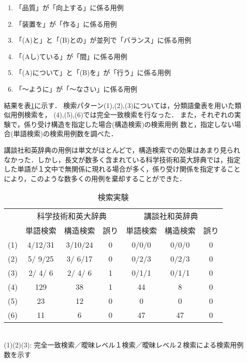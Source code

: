 \begin{enumerate}
\item 「品質」が「向上する」に係る用例
\item 「装置を」が「作る」に係る用例
\item 「(A)と」と「(B)との」が並列で「バランス」に係る用例
\item 「(Aし)ている」が「間」に係る用例
\item 「(A)について」と「(B)を」が「行う」に係る用例
\item 「〜ように」が「〜なさい」に係る用例
\end{enumerate}

結果を表\ref{answer}に示す．
検索パターン(1),(2),(3)については，分類語彙表を用いた類似用例検索を，
(4),(5),(6)では完全一致検索を行なった．
また，それぞれの実験で，係り受け構造を指定した場合(構造検索)の検索用例
数と，指定しない場合(単語検索)の検索用例数を調べた．

講談社和英辞典の用例は単文がほとんどで，構造検索での効果はあまり見られ
なかった．しかし，長文が数多く含まれている科学技術和英大辞典では，指定
した単語が１文中で無関係に現れる場合が多く，係り受け関係を指定すること
により，このような数多くの用例を棄却することができた．

\begin{table}[htb]
\begin{center}
\caption{検索実験}
\label{answer}
\begin{tabular}{|c||c|c|c|c|c|c|} \hline
\small
& \multicolumn{3}{c|}{科学技術和英大辞典} 
& \multicolumn{3}{c|}{\ \ \ 講談社和英辞典 \ \ \ } \\ \cline{2-7} 
& 単語検索  & 構造検索 & 誤り & 単語検索 & 構造検索  &  誤り \\ \hline \hline
(1) &  4/12/31 &  3/10/24 & 0 &  0/0/0 &  0/0/0 & 0     \\ \cline{1-7}
(2) &  5/ 9/25 &  3/ 6/17 & 0 &  0/2/3 &  0/2/3 & 0     \\ \cline{1-7}
(3) &  2/ 4/ 6 &  2/ 4/ 6 & 1 &  0/1/1 &  0/1/1 & 0      \\
\cline{1-7} \hline
(4) & 129 & 38 & 1 & 44 & 8 & 0     \\ \cline{1-7}
(5) & 23 & 12 & 0 & 0 & 0 & 0     \\ \cline{1-7}
(6) & 11 & 6 & 0 & 47 & 47 & 0     \\ \cline{1-7}
\end{tabular} \\
\vspace{2mm}
\small
(1)(2)(3): 
完全一致検索／曖昧レベル１検索／曖昧レベル２検索による検索用例数を示す
\end{center}
\end{table}

